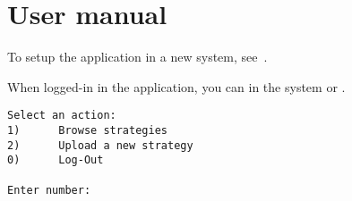 \chapter{User manual}\label{ch:manual}

To setup the application in a new system, see~.



When logged-in in the application, you can  in the system or .

\begin{verbatim}
Select an action:
1)      Browse strategies
2)      Upload a new strategy
0)      Log-Out

Enter number:
\end{verbatim}




